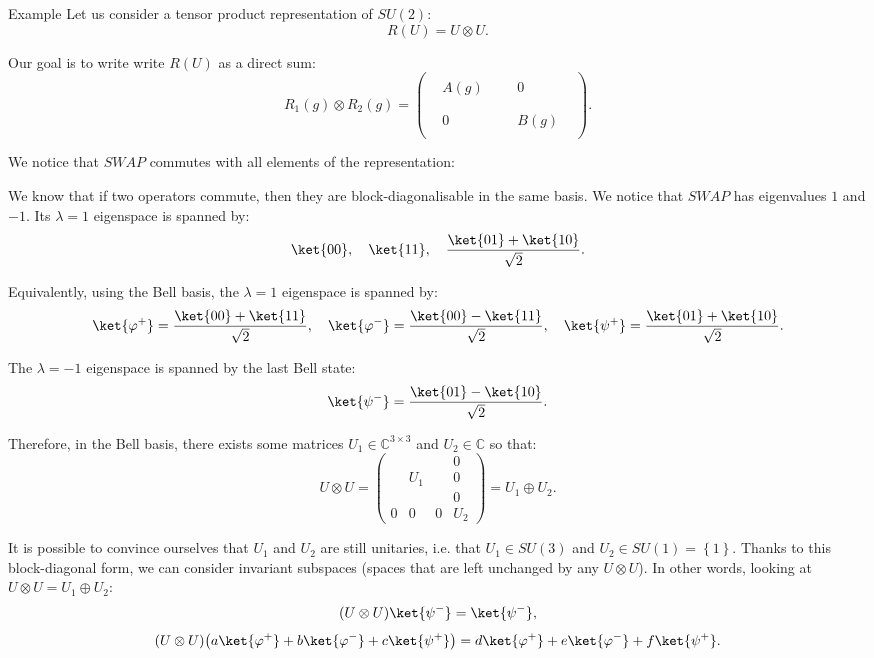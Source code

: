 \documentclass[a4paper]{article}
\begin{document}
\begin{parag}{Example}
    Let us consider a tensor product representation of $SU\left(2\right)$: 
    \[R\left(U\right) = U \otimes U.\]

    Our goal is to write write $R\left(U\right)$ as a direct sum: 
    \[R_1\left(g\right) \otimes R_2\left(g\right) = \begin{pmatrix}  &  &  &  &  &  \\  & A\left(g\right) &  &  & 0 &  \\  &  &  &  &  &  \\  &  &  &  &  &  \\  & 0 &  &  & B\left(g\right) &  \\  &  &  &  &  &  \end{pmatrix}.\]
    
    We notice that $SWAP$ commutes with all elements of the representation: 

    We know that if two operators commute, then they are block-diagonalisable in the same basis. We notice that $SWAP$ has eigenvalues $1$ and $-1$. Its $\lambda = 1$ eigenspace is spanned by: 
    \[\ket{00}, \mathspace \ket{11}, \mathspace \frac{\ket{01} + \ket{10}}{\sqrt{2}}.\]
    
    Equivalently, using the Bell basis, the $\lambda = 1$ eigenspace is spanned by: 
    \[\ket{\phi^+} = \frac{\ket{00} + \ket{11}}{\sqrt{2}}, \mathspace \ket{\phi^-} = \frac{\ket{00} - \ket{11}}{\sqrt{2}}, \mathspace \ket{\psi^+} = \frac{\ket{01} + \ket{10}}{\sqrt{2}}.\]
    
    The $\lambda = -1$ eigenspace is spanned by the last Bell state: 
    \[\ket{\psi^{-}} = \frac{\ket{01} - \ket{10}}{\sqrt{2}}.\]
    
    Therefore, in the Bell basis, there exists some matrices $U_1 \in \mathbb{C}^{3 \times 3}$ and $U_2 \in \mathbb{C}$ so that: 
    \[U \otimes U = \begin{pmatrix}  &  &  & 0 \\  &  U_1 &  & 0 \\  &  &  & 0 \\ 0 & 0 & 0 & U_2 \end{pmatrix} = U_1 \oplus U_2.\]

    It is possible to convince ourselves that $U_1$ and $U_2$ are still unitaries, i.e. that $U_1 \in SU\left(3\right)$ and $U_2 \in SU\left(1\right) = \left\{1\right\}$. Thanks to this block-diagonal form, we can consider invariant subspaces (spaces that are left unchanged by any $U \otimes U$). In other words, looking at $U \otimes U = U_1 \oplus U_2$:
    \[\left(U \otimes U\right) \ket{\psi^-} = \ket{\psi^-},\] 
    \[\left(U \otimes U\right)\left(a \ket{\phi^+} + b \ket{\phi^-} + c \ket{\psi^+}\right) = d \ket{\phi^+} + e \ket{\phi^-} + f \ket{\psi^+}.\]
    

\end{parag}
\end{document}

